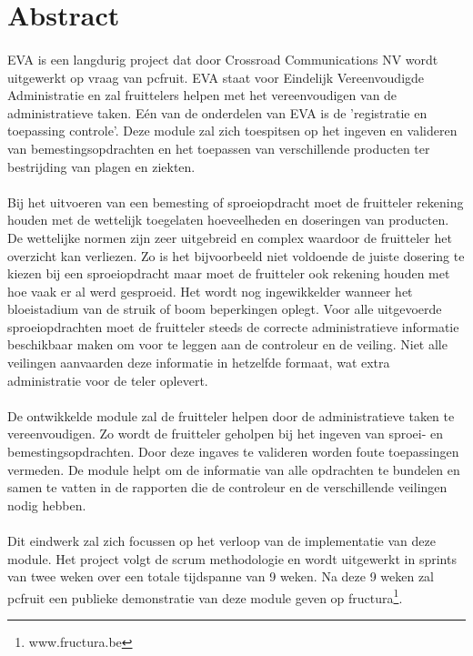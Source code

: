 \section* {Abstract}

\paragraph {} EVA is een langdurig project dat door Crossroad Communications NV wordt
uitgewerkt op vraag van pcfruit. EVA staat voor Eindelijk Vereenvoudigde Administratie en
zal fruittelers helpen met het vereenvoudigen van de administratieve taken. Eén van de
onderdelen van EVA is de 'registratie en toepassing controle'. Deze module zal zich
toespitsen op het ingeven en valideren van bemestingsopdrachten en het toepassen van
verschillende producten ter bestrijding van plagen en ziekten.

\paragraph {} Bij het uitvoeren van een bemesting of sproeiopdracht moet de fruitteler rekening
houden met de wettelijk toegelaten hoeveelheden en doseringen van producten. De wettelijke
normen zijn zeer uitgebreid en complex waardoor de fruitteler het overzicht kan
verliezen. Zo is het bijvoorbeeld niet voldoende de juiste dosering te kiezen bij een
sproeiopdracht maar moet de fruitteler ook rekening houden met hoe vaak er al werd gesproeid.
Het wordt nog
ingewikkelder wanneer het bloeistadium van de struik of boom beperkingen oplegt. Voor alle
uitgevoerde sproeiopdrachten moet de fruitteler steeds de correcte administratieve informatie
beschikbaar maken om voor te leggen aan de controleur en de veiling. Niet alle veilingen
aanvaarden deze informatie in hetzelfde formaat, wat extra administratie voor de teler
oplevert.

\paragraph {} De ontwikkelde module zal de fruitteler helpen door de administratieve taken te
vereenvoudigen. Zo wordt de fruitteler geholpen bij het ingeven van sproei- en
bemestingsopdrachten. Door deze ingaves te valideren worden foute toepassingen vermeden. De
module helpt om de informatie van alle opdrachten te bundelen en samen te vatten in de
rapporten die de controleur en de verschillende veilingen nodig hebben.

\paragraph {} Dit eindwerk zal zich focussen op het verloop van de implementatie van deze
module. Het project volgt de scrum methodologie en wordt uitgewerkt in sprints van twee
weken over een totale tijdspanne van 9 weken. Na deze 9 weken zal pcfruit een publieke
demonstratie van deze module geven op fructura\footnote{www.fructura.be}.


